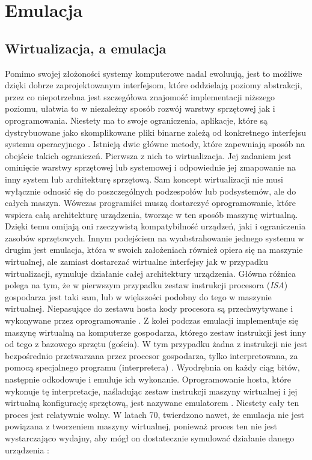 \section{Emulacja}
\subsection{Wirtualizacja, a emulacja}
Pomimo swojej złożoności systemy komputerowe nadal ewoluują, jest to możliwe dzięki dobrze zaprojektowanym interfejsom, które oddzielają poziomy abstrakcji, przez co niepotrzebna jest szczegółowa znajomość implementacji niższego poziomu, ułatwia to w niezależny sposób rozwój warstwy sprzętowej jak i oprogramowania. Niestety ma to swoje ograniczenia, aplikacje, które są dystrybuowane jako skomplikowane pliki binarne zależą od konkretnego interfejsu systemu operacyjnego \cite{James}. Istnieją dwie główne metody, które zapewniają sposób na obejście takich ograniczeń. Pierwsza z nich to wirtualizacja. Jej zadaniem jest ominięcie warstwy sprzętowej lub systemowej i odpowiednie jej zmapowanie na inny system lub architekturę sprzętową. Sam koncept wirtualizacji nie musi wyłącznie odnosić się do poszczególnych podzespołów lub podsystemów, ale do całych maszyn. Wówczas programiści muszą dostarczyć oprogramowanie, które wspiera całą architekturę urządzenia\cite{James, Popek}, tworząc w ten sposób maszynę wirtualną. Dzięki temu omijają oni rzeczywistą kompatybilność urządzeń, jaki i ograniczenia zasobów sprzętowych. Innym podejściem na wyabstrahowanie jednego systemu w drugim jest emulacja, która w swoich założeniach również opiera się na maszynie wirtualnej, ale zamiast dostarczać wirtualne interfejsy jak w przypadku wirtualizacji, symuluje działanie całej architektury urządzenia. Główna różnica polega na tym, że w pierwszym przypadku zestaw instrukcji procesora (\textit{ISA}) gospodarza \cite{James} jest taki sam, lub w większości podobny do tego w maszynie wirtualnej. Niepasujące do zestawu hosta kody procesora są przechwytywane i wykonywane przez oprogramowanie \cite{ROSENTHAL}. Z kolei podczas emulacji implementuje się maszynę wirtualną na komputerze gospodarza, którego zestaw instrukcji jest inny od tego z bazowego sprzętu (gościa). W tym przypadku żadna z instrukcji nie jest bezpośrednio przetwarzana przez procesor gospodarza, tylko interpretowana, za pomocą specjalnego programu (interpretera) \cite{James}. Wyodrębnia on każdy ciąg bitów, następnie odkodowuje i emuluje ich wykonanie. Oprogramowanie hosta, które wykonuje tę interpretacje, naśladując zestaw instrukcji maszyny wirtualnej i jej wirtualną konfigurację sprzętową, jest nazywane emulatorem \cite{ROSENTHAL}. Niestety cały ten proces jest relatywnie wolny. W latach 70, twierdzono nawet, że emulacja nie jest powiązana z tworzeniem maszyny wirtualnej, ponieważ proces ten nie jest wystarczająco wydajny, aby mógł on dostatecznie symulować działanie danego urządzenia \cite{Popek}:
